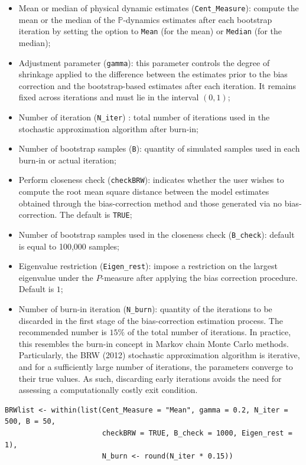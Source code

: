 \begin{itemize}
\item
  Mean or median of physical dynamic estimates (\texttt{Cent\_Measure}): compute the mean or the median of the \(\mathbb{P}\)-dynamics estimates after each bootstrap iteration by setting the option to \texttt{Mean} (for the mean) or \texttt{Median} (for the median);
\item
  Adjustment parameter (\texttt{gamma}): this parameter controls the degree of shrinkage applied to the difference between the estimates prior to the bias correction and the bootstrap-based estimates after each iteration. It remains fixed across iterations and must lie in the interval \((0,1)\);
\item
  Number of iteration (\texttt{N\_iter}) : total number of iterations used
  in the stochastic approximation algorithm after burn-in;
\item
  Number of bootstrap samples (\texttt{B}): quantity of simulated samples
  used in each burn-in or actual iteration;
\item
  Perform closeness check (\texttt{checkBRW}): indicates whether the user wishes to compute the root mean square distance between the model estimates obtained through the bias-correction method and those generated via no bias-correction. The default is \texttt{TRUE};
\item
  Number of bootstrap samples used in the closeness check (\texttt{B\_check}):
  default is equal to 100,000 samples;
\item
  Eigenvalue restriction (\texttt{Eigen\_rest}): impose a restriction on the largest eigenvalue under the \(P\)-measure after applying the bias correction procedure. Default is \(1\);
\item
  Number of burn-in iteration (\texttt{N\_burn}): quantity of the iterations
  to be discarded in the first stage of the bias-correction estimation
  process. The recommended number is \(15\%\) of the total number of
  iterations. In practice, this resembles the burn-in concept in Markov chain Monte Carlo methods. Particularly, the BRW (2012) stochastic approximation algorithm is iterative, and for a sufficiently large number of iterations, the parameters converge to their true values. As such, discarding early iterations avoids the need for assessing a computationally costly exit condition.
\end{itemize}

\begin{verbatim}
BRWlist <- within(list(Cent_Measure = "Mean", gamma = 0.2, N_iter = 500, B = 50,
                       checkBRW = TRUE, B_check = 1000, Eigen_rest = 1),
                       N_burn <- round(N_iter * 0.15))
\end{verbatim}


